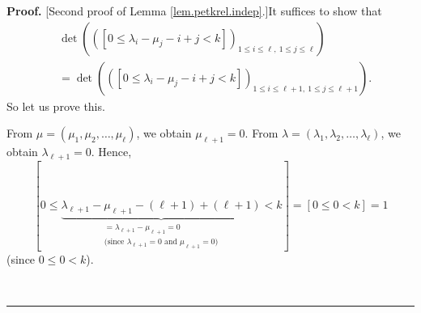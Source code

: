 \documentclass[numbers=enddot,12pt,final,onecolumn,notitlepage]{scrartcl}%
\theoremstyle{definition}
\newenvironment{proof}[1][Proof]{\noindent\textbf{#1.} }{\ \rule{0.5em}{0.5em}}
\newenvironment{verlong}{}{}
\begin{document}
\begin{verlong}
\begin{proof}
[Second proof of Lemma \ref{lem.petkrel.indep}.]It suffices to show that%
\begin{align*}
&  \det\left(  \left(  \left[  0\leq\lambda_{i}-\mu_{j}-i+j<k\right]  \right)
_{1\leq i\leq\ell,\ 1\leq j\leq\ell}\right) \\
&  =\det\left(  \left(  \left[  0\leq\lambda_{i}-\mu_{j}-i+j<k\right]
\right)  _{1\leq i\leq\ell+1,\ 1\leq j\leq\ell+1}\right)  .
\end{align*}
So let us prove this.

From $\mu=\left(  \mu_{1},\mu_{2},\ldots,\mu_{\ell}\right)  $, we obtain
$\mu_{\ell+1}=0$. From $\lambda=\left(  \lambda_{1},\lambda_{2},\ldots
,\lambda_{\ell}\right)  $, we obtain $\lambda_{\ell+1}=0$. Hence,%
\[
\left[  0\leq\underbrace{\lambda_{\ell+1}-\mu_{\ell+1}-\left(  \ell+1\right)
+\left(  \ell+1\right)  }_{\substack{=\lambda_{\ell+1}-\mu_{\ell
+1}=0\\\text{(since }\lambda_{\ell+1}=0\text{ and }\mu_{\ell+1}=0\text{)}%
}}<k\right]  =\left[  0\leq0<k\right]  =1
\]
(since $0\leq0<k$).


\end{proof}
\end{verlong}
\end{document}
